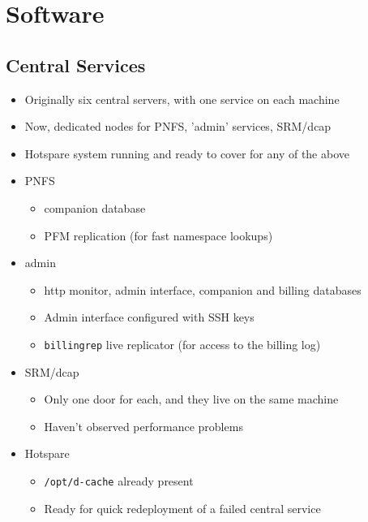 \documentclass{beamer}
\begin{document}
\section{Software}
\subsection{Central Services}
\begin{frame}
\begin{itemize}
	\item Originally six central servers, with one service on each machine
	\item Now, dedicated nodes for PNFS, 'admin' services, SRM/dcap
	\item Hotspare system running and ready to cover for any of the above
	\item PNFS
	\begin{itemize}
		\item companion database
		\item PFM replication (for fast namespace lookups)
	\end{itemize}
	\item admin
	\begin{itemize}
		\item http monitor, admin interface, companion and billing databases
		\item Admin interface configured with SSH keys
		\item {\tt billingrep} live replicator (for access to the billing log)
	\end{itemize}
	\item SRM/dcap
	\begin{itemize}
		\item Only one door for each, and they live on the same machine
		\item Haven't observed performance problems
	\end{itemize}
	\item Hotspare
	\begin{itemize}
		\item {\tt /opt/d-cache} already present
		\item Ready for quick redeployment of a failed central service
	\end{itemize}
\end{itemize}
\end{frame}
\end{document}
